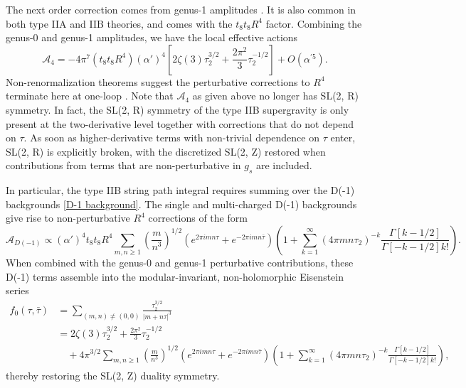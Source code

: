 
The next order correction comes from genus-1 amplitudes \cite{Green:1999pv}.
It is also common in both type IIA and IIB theories, and comes with the $t_8 t_8 R^4$ factor. 
Combining the genus-0 and genus-1 amplitudes, we have the local effective actions
\begin{equation}
\mathcal{A}_4 = -4\pi^7 (t_8 t_8 R^4)(\alpha')^4
\left[
2 \zeta(3)\tau_2^{3/2}
+\frac{2\pi^2}{3}\tau_2^{-1/2}
\right]
+O(\alpha^{\prime 5}).
\end{equation}
Non-renormalization theorems suggest the perturbative corrections to $R^4$ terminate here at one-loop \cite{Green:1997tv,Kehagias:1997cq}.
Note that $\mathcal{A}_4$ as given above no longer has SL(2, R) symmetry. 
In fact, the SL(2, R) symmetry of the type IIB supergravity is only present at the two-derivative level together with corrections that do not depend on $\tau$.
As soon as higher-derivative terms with non-trivial dependence on $\tau$ enter, SL(2, R) is explicitly broken, with the discretized SL(2, Z) restored when contributions from terms that are non-perturbative in $g_s$ are included. 

In particular, the type IIB string path integral requires summing over the D(-1) backgrounds \eqref{D-1 background}.
The single and multi-charged D(-1) backgrounds give rise to non-perturbative $R^4$ corrections \cite{Green:1997tv,Kehagias:1997cq} of the form
\begin{equation}
\mathcal A_{D(-1)}\propto (\alpha')^4t_8t_8R^4\sum_{m,n\ge1}\left(\frac{m}{n^3}\right)^{1/2}
(e^{2\pi i mn\tau}+e^{-2\pi i mn\bar{\tau}})
\left(
1+\sum_{k=1}^\infty(4\pi mn\tau_2)^{-k}\frac{\Gamma[k-1/2]}{\Gamma[-k-1/2]k!}
\right).
\end{equation}
When combined with the genus-0 and genus-1 perturbative contributions, these D(-1) terms assemble into the modular-invariant, non-holomorphic Eisenstein series
\begin{equation}
\begin{aligned}
f_0(\tau,\bar\tau)
&=\sum_{(m,n)\neq(0,0)}\frac{\tau_2^{3/2}}{|m+n\tau|^3}\\
&=2\zeta(3)\tau_2^{3/2}+\frac{2\pi^2}{3}\tau_2^{-1/2}\\
&\quad+4\pi^{3/2}\sum_{m,n\ge1}\left(\frac{m}{n^3}\right)^{1/2}
(e^{2\pi i mn\tau}+e^{-2\pi i mn\bar{\tau}})
\left(
1+\sum_{k=1}^\infty(4\pi mn\tau_2)^{-k}\frac{\Gamma[k-1/2]}{\Gamma[-k-1/2]k!}
\right),
\end{aligned}
\end{equation}
thereby restoring the SL(2, Z) duality symmetry.

